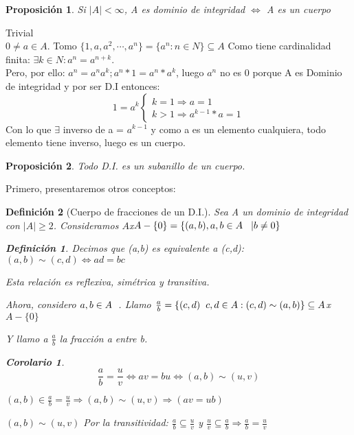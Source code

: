 \documentclass[11pt, a4paper, titlepage]{article}
\makeatletter
\renewenvironment{proof}[1][\proofname] {\vspace{-15pt}\par\pushQED{\qed}\normalfont\topsep6\p@\@plus6\p@\relax\trivlist\item[\hskip\labelsep\it#1\@addpunct{.}]\ignorespaces}{\popQED\endtrivlist\@endpefalse}
\theoremstyle{theorem-style}
\newtheorem*{nprop}{Proposición}
\newtheorem{ncor}{Corolario}
\theoremstyle{definition-style}
\newtheorem*{ndef}{Definición}
\theoremstyle{remark-style}
\theoremstyle{example-style}
\makeatother
\begin{document}
\begin{nprop}
	Si $|A|< \infty$, A es dominio de integridad $\iff$ A es un cuerpo
\end{nprop}
\begin{proof}
	\boxed{\Leftarrow} Trivial\\
	\boxed{\Rightarrow} $0 \neq a \in A$.
Tomo $\{1,a,a^2,\cdots,a^n\} = \{a^n: n\in N\} \subseteq A$
Como tiene cardinalidad finita: $\exists k \in N : a^n = a^{n+k}$.\\
Pero, por ello: $a^n = a^n a^k; a^n * 1 = a^n * a^k$, luego $a^n$ no es 0 porque A es Dominio de integridad y por ser D.I entonces:
\[
1=a^k \begin{cases}
	k = 1 \Rightarrow a = 1\\
	k > 1 \Rightarrow a^{k-1}*a = 1
	
\end{cases}\]
Con lo que $\exists$ inverso de a = $a^{k-1}$ y como a es un elemento cualquiera, todo elemento tiene inverso, luego es un cuerpo.
\end{proof}


\begin{nprop}
	Todo D.I. es un subanillo de un cuerpo.
\end{nprop}


Primero, presentaremos otros conceptos:

\begin{ndef}[Cuerpo de fracciones de un D.I.]
Sea A un dominio de integridad con $|A| \geq 2$. Consideramos $A$x$A-\{0\} = \{(a,b), a,b \in A\hspace{0.3cm} | b\neq 0\}$

\begin{ndef} Decimos que (a,b) es equivalente a (c,d):
	$(a,b)\sim(c,d) \iff ad = bc$
	
Esta relación es reflexiva, simétrica y transitiva.
\end{ndef}
	
Ahora, considero $a,b\in A \hspace{0.2cm}$. Llamo $\frac{a}{b} = \{(c,d)\hspace{0.2cm} c,d \in A : (c,d) \sim (a,b)\} \subseteq A$x$A-\{0\}$

Y llamo a $\frac{a}{b}$ la fracción a entre b.

\begin{ncor}
	\[\frac{a}{b}= \frac{u}{v} \iff av = bu \iff (a,b) \sim (u,v)\]
\end{ncor}
\begin{proof}
	
	\boxed{\Rightarrow} $(a,b) \in \frac{a}{b} = \frac{u}{v} \Rightarrow (a,b) \sim (u,v) \Rightarrow (av = ub)$
	
	\boxed{\Leftarrow} $(a,b) \sim (u,v)$ Por la transitividad: $\frac{a}{b} \subseteq \frac{u}{v}$ y $\frac{u}{v} \subseteq \frac{a}{b} \Rightarrow \frac{a}{b}= \frac{u}{v}$
\end{proof}
\end{ndef}
\end{document}
